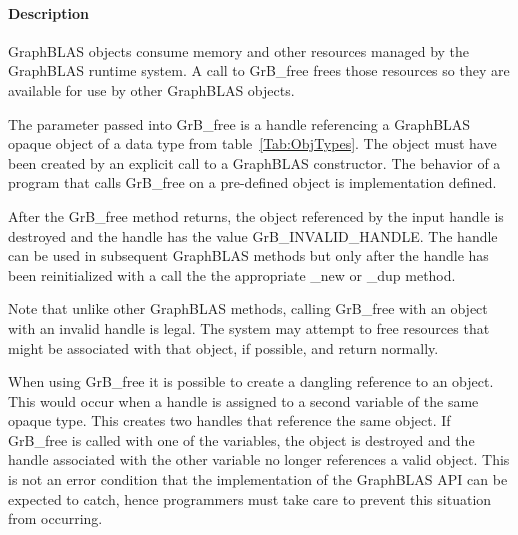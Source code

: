 \paragraph{Description}

GraphBLAS objects consume memory and other resources managed by the
GraphBLAS runtime system. A call to {\sf GrB\_free} frees those resources
so they are available for use by other GraphBLAS objects.

The parameter passed into {\sf GrB\_free} is a handle referencing a
GraphBLAS opaque object of a data type from table~\ref{Tab:ObjTypes}.
The object must have been created by an explicit call to a GraphBLAS
constructor.  The behavior of a program that calls {\sf GrB\_free}
on a pre-defined object is implementation defined.

After the {\sf GrB\_free} method returns, the object referenced
by the input handle is destroyed and the handle has the value {\sf
GrB\_INVALID\_HANDLE}.  The handle can be used in subsequent GraphBLAS
methods but only after the handle has been reinitialized with a call
the the appropriate {\sf \_new} or {\sf \_dup} method.

Note that unlike other GraphBLAS methods, calling {\sf GrB\_free} with
an object with an invalid handle is legal.  The system may attempt to
free resources that might be associated with that object, if possible,
and return normally.

When using {\sf GrB\_free} it is possible to create a dangling reference
to an object.  This would occur when a handle is assigned to a second
variable of the same opaque type.  This creates two handles that reference
the same object. If {\sf GrB\_free} is called with one of the variables,
the object is destroyed and the handle associated with the other variable
no longer references a valid object.  This is not an error condition
that the implementation of the GraphBLAS API can be expected to catch,
hence programmers must take care to prevent this situation from occurring.
